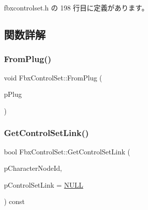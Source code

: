  fbxcontrolset.\+h の 198 行目に定義があります。



\subsection{関数詳解}
\mbox{\label{class_fbx_control_set_a75413f090af90a642bb5fc7434ac805b}} 
\subsubsection{\texorpdfstring{From\+Plug()}{FromPlug()}}
{\footnotesize\ttfamily void Fbx\+Control\+Set\+::\+From\+Plug (\begin{DoxyParamCaption}\item[{\hyperlink{class_fbx_control_set_plug}{Fbx\+Control\+Set\+Plug} $\ast$}]{p\+Plug }\end{DoxyParamCaption})}

\mbox{\label{class_fbx_control_set_aec762ddd33c928ef92493332ad5adcc8}} 
\subsubsection{\texorpdfstring{Get\+Control\+Set\+Link()}{GetControlSetLink()}}
{\footnotesize\ttfamily bool Fbx\+Control\+Set\+::\+Get\+Control\+Set\+Link (\begin{DoxyParamCaption}\item[{\hyperlink{class_fbx_character_ad75bf42026e435ac0ff4d7ece2317be4}{Fbx\+Character\+::\+E\+Node\+Id}}]{p\+Character\+Node\+Id,  }\item[{\hyperlink{class_fbx_control_set_link}{Fbx\+Control\+Set\+Link} $\ast$}]{p\+Control\+Set\+Link = {\ttfamily \hyperlink{fbxarch_8h_a070d2ce7b6bb7e5c05602aa8c308d0c4}{N\+U\+LL}} }\end{DoxyParamCaption}) const}

